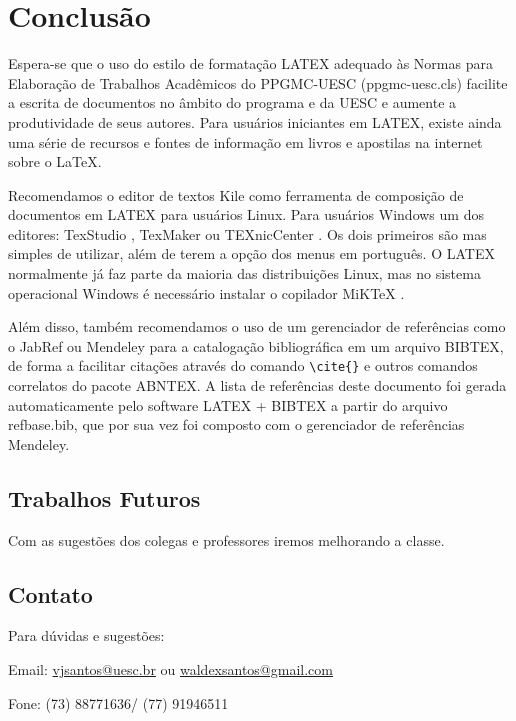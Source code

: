 %
\chapter{Conclusão}\label{chap:conclusao}
Espera-se que o uso do estilo de formatação LATEX adequado às Normas para Elaboração de Trabalhos Acadêmicos do PPGMC-UESC ({\ttfamily ppgmc-uesc.cls}) facilite a escrita de documentos no âmbito do programa e da UESC e aumente a produtividade de seus autores. Para usuários iniciantes em LATEX, existe ainda uma série de recursos  e fontes de informação em livros e apostilas na internet sobre o \LaTeX \cite{CTAN214,Wikibooks14}.

Recomendamos o editor de textos Kile como ferramenta de composição de documentos em LATEX para usuários Linux. Para usuários Windows um dos editores: TexStudio \cite{TexStudio}, TexMaker \cite{TexMaker} ou   TEXnicCenter \cite{TeXnicCenter} . Os dois primeiros são mas simples de utilizar, além de terem a opção dos menus em português. O LATEX normalmente já faz parte da maioria das distribuições Linux, mas no sistema operacional Windows é necessário instalar  o copilador MiKTeX \cite{MiKTeX}. 

Além disso, também recomendamos o uso de um gerenciador de referências como o JabRef \cite{JabRef} ou Mendeley \cite{Mendeley} para a catalogação bibliográfica em um arquivo BIBTEX, de forma a facilitar citações através do comando \verb#\cite{}# e outros comandos correlatos do pacote ABNTEX. A lista de referências deste documento foi gerada automaticamente pelo software LATEX + BIBTEX a partir do arquivo {\ttfamily refbase.bib}, que por sua vez foi composto com o gerenciador de referências Mendeley.

\section{Trabalhos Futuros}
\label{sec:trabalhosFuturos}

Com as sugestões dos colegas e professores iremos melhorando a classe.
\section{Contato}
\label{sec:contatos}
Para dúvidas e sugestões:

Email: \href{vjsantos@uesc.br}{vjsantos@uesc.br} ou \href{waldexsantos@gmail.com}{waldexsantos@gmail.com}

Fone: (73) 88771636/ (77) 91946511
